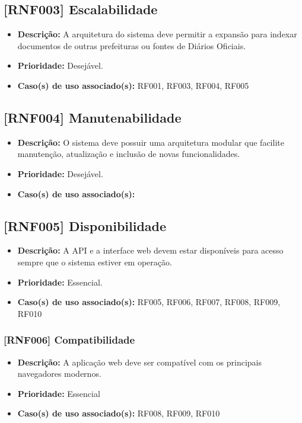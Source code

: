 \subsection{[RNF003] Escalabilidade}
\begin{itemize}
    \item \textbf{Descrição:} A arquitetura do sistema deve permitir a expansão para indexar documentos de outras prefeituras ou fontes de Diários Oficiais.
    \item \textbf{Prioridade:} Desejável.
    \item \textbf{Caso(s) de uso associado(s):} RF001, RF003, RF004, RF005
\end{itemize}


\subsection{[RNF004] Manutenabilidade}
\begin{itemize}
    \item \textbf{Descrição:} O sistema deve possuir uma arquitetura modular que facilite manutenção, atualização e inclusão de novas funcionalidades.
    \item \textbf{Prioridade:} Desejável.
    \item \textbf{Caso(s) de uso associado(s):}
\end{itemize}

\subsection{[RNF005] Disponibilidade}
\begin{itemize}
    \item \textbf{Descrição:} A API e a interface web devem estar disponíveis para acesso sempre que o sistema estiver em operação.
    \item \textbf{Prioridade:} Essencial.
    \item \textbf{Caso(s) de uso associado(s):} RF005, RF006, RF007, RF008, RF009, RF010
\end{itemize}

\subsubsection{[RNF006] Compatibilidade}
\begin{itemize}
    \item \textbf{Descrição:} A aplicação web deve ser compatível com os principais navegadores modernos. 
    \item \textbf{Prioridade:} Essencial
    \item \textbf{Caso(s) de uso associado(s):} RF008, RF009, RF010
\end{itemize}


